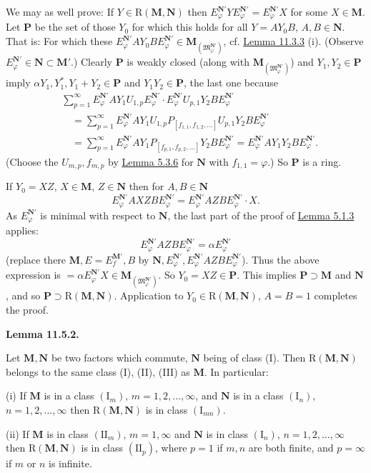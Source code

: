 \documentclass[12pt,b5paper,twoside]{article}
\newcommand{\M}{\mathbf M}
\newcommand{\N}{\mathbf N}
\renewcommand{\P}{\mathbf P}
\newcommand{\Lemma}[1]{%
  \par\smallskip\noindent\phantomsection\label{lem:#1}\textbf{Lemma #1.}\enspace
}
\newcommand{\lemref}[1]{\hyperref[lem:#1]{Lemma #1}}
\begin{document}
We may as well prove: If $Y\in\mathrm R(\M,\N)$ then
$E_{\varphi}^{\N'}YE_{\varphi}^{\N'}=E_{\varphi}^{\N'}X$ for some
$X\in\M$. Let $\P$ be the set of those $Y_0$ for which this holds for all
$Y=AY_0B$, $A,B\in\N$. That is: For which these
$E_{\varphi}^{\N'}AY_0BE_{\varphi}^{\N'}
\in\M_{(\mathfrak M_{\varphi}^{\N'})}$, cf. \lemref{11.3.3} (i).
(Observe $E_{\varphi}^{\N'}\in\N\subset\M'$.) Clearly $\P$ is weakly
closed (along with $\M_{(\mathfrak M_{\varphi}^{\N'})}$) and
$Y_1,Y_2\in\P$ imply $\alpha Y_1,Y_1^*,Y_1+Y_2\in\P$ and
$Y_1Y_2\in\P$, the last one because
\begin{align*}
 &\sum_{p=1}^{\infty}E_{\varphi}^{\N'}AY_1U_{1,p}E_{\varphi}^{\N'}
 \cdot E_{\varphi}^{\N'}U_{p,1}Y_2BE_{\varphi}^{\N'}\\
 &\quad=\sum_{p=1}^{\infty}E_{\varphi}^{\N'}AY_1U_{1,p}
 P_{[f_{1,1},f_{1,2},\ldots]}U_{p,1}Y_2BE_{\varphi}^{\N'}\\
 &\quad=\sum_{p=1}^{\infty}E_{\varphi}^{\N'}AY_1
 P_{[f_{p,1},f_{p,2},\ldots]}Y_2BE_{\varphi}^{\N'}
 =E_{\varphi}^{\N'}AY_1Y_2BE_{\varphi}^{\N'}.
\end{align*}
(Choose the $U_{m,p},f_{m,p}$ by \lemref{5.3.6} for $\N$ with
$f_{1,1}=\varphi$.) So $\P$ is a ring.

If $Y_0=XZ$, $X\in\M$, $Z\in\N$ then for $A,B\in\N$
\[
 E_{\varphi}^{\N'}AXZBE_{\varphi}^{\N'}
 =E_{\varphi}^{\N'}AZBE_{\varphi}^{\N'}\cdot X.
\]
As $E_{\varphi}^{\N'}$ is minimal with respect to $\N$, the last part of
the proof of \lemref{5.1.3} applies:
\[
 E_{\varphi}^{\N'}AZBE_{\varphi}^{\N'}=\alpha E_{\varphi}^{\N'}
\]
(replace there $\M,E=E_f^{\M'},B$ by
$\N,E_{\varphi}^{\N'},E_{\varphi}^{\N'}AZBE_{\varphi}^{\N'}$). Thus the
above expression is
$=\alpha E_{\varphi}^{\N'}X\in
\M_{(\mathfrak M_{\varphi}^{\N'})}$. So $Y_0=XZ\in\P$. This implies
$\P\supset\M$ and $\N$, and so $\P\supset\mathrm R(\M,\N)$. Application
to $Y_0\in\mathrm R(\M,\N)$, $A=B=1$ completes the proof.

\Lemma{11.5.2}
Let $\M,\N$ be two factors which commute, $\N$ being of class (I). Then
$\mathrm R(\M,\N)$ belongs to the same class (I), (II), (III) as $\M$.
In particular:

(i) If $\M$ is in a class $(\mathrm I_m)$,
$m=1,2,\ldots,\infty$, and $\N$ is in a class $(\mathrm I_n)$,
$n=1,2,\ldots,\infty$ then $\mathrm R(\M,\N)$ is in class
$(\mathrm I_{mn})$.

(ii) If $\M$ is in class $(\mathrm{II}_m)$, $m=1,\infty$ and $\N$ is in
class $(\mathrm I_n)$, $n=1,2,\ldots,\infty$ then
$\mathrm R(\M,\N)$ is in class $(\mathrm{II}_p)$, where $p=1$ if $m,n$
are both finite, and $p=\infty$ if $m$ or $n$ is infinite.
\end{document}
